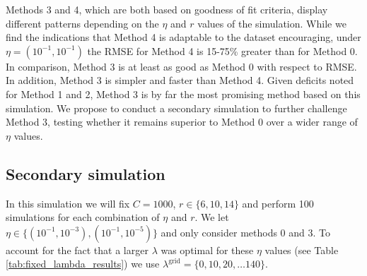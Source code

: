 \documentclass[12pt]{article}
\newcommand{\lambdagrid}{\lambda^{\text{grid}}}
\theoremstyle{break}
\theoremstyle{break}
\begin{document}
Methods 3 and 4, which are both based on goodness of fit criteria, display different patterns depending on the $\eta$ and $r$ values of the simulation.
While we find the indications that Method 4 is adaptable to the dataset encouraging, under $\eta = (10^{-1}, 10^{-1})$ the RMSE for Method 4 is 15-75\% greater than for Method 0. In comparison, Method 3 is at least as good as Method 0 with respect to RMSE. In addition,  Method 3 is simpler and faster than Method 4.  Given deficits noted for Method 1 and 2, Method 3 is by far the most promising method based on this simulation.  We propose to conduct a secondary simulation to further challenge Method 3, testing whether it remains superior to Method 0 over a wider range of $\eta$ values.




\subsection{Secondary simulation}
\label{sec:tuning_simulation_2}


In this simulation we will fix $C = 1000$, $r \in \{6, 10, 14\}$ and perform 100 simulations for each combination of $\eta$ and $r$.  We let $\eta \in \{ (10^{-1}, 10^{-3}), (10^{-1}, 10^{-5}) \}$ and only consider methods 0 and 3.  To account for the fact that a larger $\lambda$ was optimal for these $\eta$ values (see Table \ref{tab:fixed_lambda_results}) we use $\lambdagrid = \{0,10,20, \dots 140 \}$.
\end{document}
